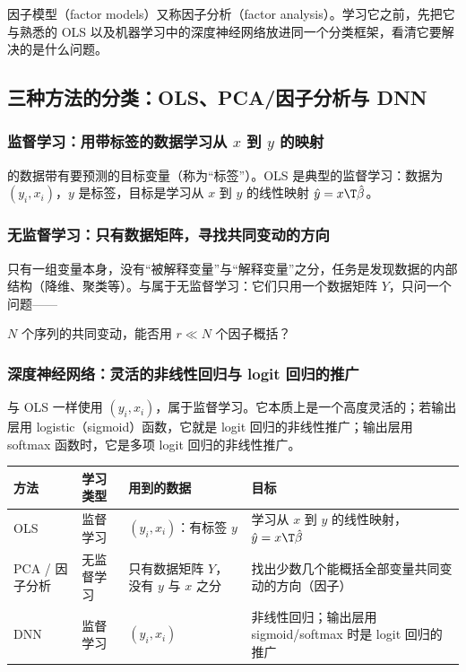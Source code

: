 因子模型（factor models）又称因子分析（factor analysis）。学习它之前，先把它与熟悉的 OLS 以及机器学习中的深度神经网络放进同一个分类框架，看清它要解决的是什么问题。

\subsection{三种方法的分类：OLS、PCA/因子分析与 DNN}

\subsubsection{监督学习：用带标签的数据学习从 \texorpdfstring{$x$}{x} 到 \texorpdfstring{$y$}{y} 的映射}

的数据带有要预测的目标变量（称为“标签”）。OLS 是典型的监督学习：数据为 $(y_i,x_i)$，$y$ 是标签，目标是学习从 $x$ 到 $y$ 的线性映射 $\hat y=x\T\hat\beta$。

\subsubsection{无监督学习：只有数据矩阵，寻找共同变动的方向}

只有一组变量本身，没有“被解释变量”与“解释变量”之分，任务是发现数据的内部结构（降维、聚类等）。与属于无监督学习：它们只用一个数据矩阵 $Y$，只问一个问题——
\begin{center}
$N$ 个序列的共同变动，能否用 $r\ll N$ 个因子概括？
\end{center}

\subsubsection{深度神经网络：灵活的非线性回归与 logit 回归的推广}

与 OLS 一样使用 $(y_i,x_i)$，属于监督学习。它本质上是一个高度灵活的；若输出层用 logistic（sigmoid）函数，它就是 logit 回归的非线性推广；输出层用 softmax 函数时，它是多项 logit 回归的非线性推广。

\begin{center}
\small
\begin{tabularx}{\linewidth}{@{}l l L L@{}}
\toprule
方法 & 学习类型 & 用到的数据 & 目标\\
\midrule
OLS & 监督学习 & $(y_i,x_i)$：有标签 $y$ & 学习从 $x$ 到 $y$ 的线性映射，$\hat y=x\T\hat\beta$\\
PCA / 因子分析 & 无监督学习 & 只有数据矩阵 $Y$，没有 $y$ 与 $x$ 之分 & 找出少数几个能概括全部变量共同变动的方向（因子）\\
DNN & 监督学习 & $(y_i,x_i)$ & 非线性回归；输出层用 sigmoid/softmax 时是 logit 回归的推广\\
\bottomrule
\end{tabularx}
\label{tab:U13a-ml}
\end{center}

